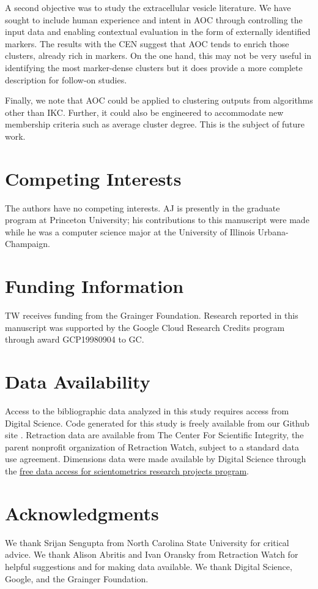 \documentclass[12pt, oneside]{article}   	%
\begin{document}
A second objective was to study the extracellular vesicle literature. We have sought to include human experience and intent \citep{vonluxburg2012clustering} in AOC through controlling the input data and enabling contextual evaluation in the form of externally identified markers. The results with the CEN suggest that AOC tends to enrich those clusters, already rich in markers. On the one hand, this may not be very useful in identifying the most marker-dense clusters but it does provide a more complete description for follow-on studies. 

Finally, we note that AOC could be applied to clustering  outputs from algorithms other than IKC. Further, it could also be engineered to accommodate new membership criteria such as average cluster degree. This is the subject of future work. 
	
\section*{Competing Interests} \vspace{3mm} The authors have no competing interests. AJ is presently in the graduate program at Princeton University; his contributions to this manuscript were made while he was a computer science major at the University of Illinois Urbana-Champaign.
	
\section*{Funding Information} TW receives funding from the Grainger Foundation. Research reported in this manuscript was supported by the Google Cloud Research Credits program through award GCP19980904 to GC.
	
\section*{Data Availability} Access to the bibliographic data analyzed in this study requires access from Digital Science. Code generated for this study is freely available from our Github site \citep{Park2021}. Retraction data are available from The Center For Scientific Integrity, the parent nonprofit organization of Retraction Watch, subject to a standard data use agreement. Dimensions data were made available by Digital Science through the \href{http://www.dimensions.ai/scientometric-research/.}{free data access for scientometrics research projects program}.
	
\section*{Acknowledgments} We thank Srijan Sengupta from North Carolina State University for critical advice. We thank Alison Abritis and Ivan Oransky from Retraction Watch for helpful suggestions and for making data available. We thank Digital Science, Google, and the Grainger Foundation. 



\end{document}
